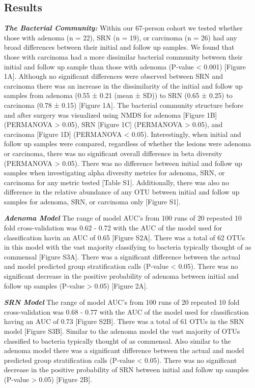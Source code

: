 \documentclass[12pt,]{article}
\begin{document}
\newpage

\subsection{Results}\label{results}

\textbf{\emph{The Bacterial Community:}} Within our 67-person cohort we
tested whether those with adenoma (n = 22), SRN (n = 19), or carcinoma
(n = 26) had any broad differences between their initial and follow up
samples. We found that those with carcinoma had a more dissimilar
bacterial community between their initial and follow up sample than
those with adenoma (P-value \textless{} 0.001) {[}Figure 1A{]}. Although
no significant differences were observed between SRN and carcinoma there
was an increase in the dissimilarity of the initial and follow up
samples from adenoma (0.55 ± 0.21 (mean ± SD)) to SRN (0.65 ± 0.25) to
carcinoma (0.78 ± 0.15) {[}Figure 1A{]}. The bacterial community
structure before and after surgery was visualized using NMDS for adenoma
{[}Figure 1B{]} (PERMANOVA \textgreater{} 0.05), SRN {[}Figure 1C{]}
(PERMANOVA \textgreater{} 0.05), and carcinoma {[}Figure 1D{]}
(PERMANOVA \textless{} 0.05). Interestingly, when initial and follow up
samples were compared, regardless of whether the lesions were adenoma or
carcinoma, there was no significant overall difference in beta diversity
(PERMANOVA \textgreater{} 0.05). There was no difference between initial
and follow up samples when investigating alpha diversity metrics for
adenoma, SRN, or carcinoma for any metric tested {[}Table S1{]}.
Additionally, there was also no difference in the relative abundance of
any OTU between initial and follow up samples for adenoma, SRN, or
carcinoma only {[}Figure S1{]}.

\textbf{\emph{Adenoma Model}} The range of model AUC's from 100 runs of
20 repeated 10 fold cross-validation was 0.62 - 0.72 with the AUC of the
model used for classification havin an AUC of 0.65 {[}Figure S2A{]}.
There was a total of 62 OTUs in this model with the vast majority
classifying to bacteria typically thought of as commensal {[}Figure
S3A{]}. There was a significant difference between the actual and model
predicted group stratification calls (P-value \textless{} 0.05). There
was no significant decrease in the positive probability of adenoma
between initial and follow up samples (P-value \textgreater{} 0.05)
{[}Figure 2A{]}.

\textbf{\emph{SRN Model}} The range of model AUC's from 100 runs of 20
repeated 10 fold cross-validation was 0.68 - 0.77 with the AUC of the
model used for classification having an AUC of 0.73 {[}Figure S2B{]}.
There was a total of 61 OTUs in the SRN model {[}Figure S3B{]}. Similar
to the adenoma model the vast majority of OTUs classified to bacteria
typically thought of as commensal. Also similar to the adenoma model
there was a significant difference between the actual and model
predicted group stratification calls (P-value \textless{} 0.05). There
was no significant decrease in the positive probability of SRN between
initial and follow up samples (P-value \textgreater{} 0.05) {[}Figure
2B{]}.
\end{document}
